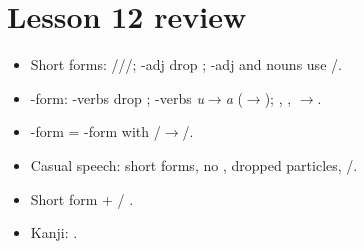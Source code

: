 \section*{Lesson 12 review}
\begin{itemize}
  \item Short forms: ///;
        -adj drop ; -adj and nouns use /.
  \item {}-form: -verbs drop ; -verbs \emph{u}$\to$\emph{a}
        ($\to$); , , $\to$.
  \item {}-form = -form with /$\to$/.
  \item Casual speech: short forms, no , dropped particles, /.
  \item Short form +  / .
  \item Kanji: .
\end{itemize}
